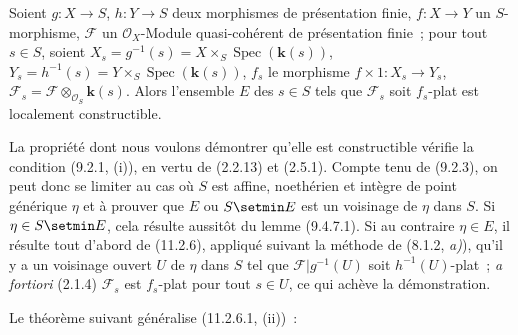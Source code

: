 \begin{proposition}[11.2.8]
\label{IV.11.2.8-fr}
Soient $g:X\to S$, $h:Y\to S$ deux morphismes de présentation finie,
$f:X\to Y$ un $S$-morphisme, $\mathcal F$ un
$\mathcal O_X$-Module quasi-cohérent de présentation finie~; pour tout
$s\in S$, soient $X_s=g^{-1}(s)=X\times_S\operatorname{Spec}(\boldsymbol{k}(s))$,
$Y_s=h^{-1}(s)=Y\times_S\operatorname{Spec}(\boldsymbol{k}(s))$, $f_s$ le morphisme
$f\times1:X_s\to Y_s$, $\mathcal F_s=\mathcal F\otimes_{\mathcal O_S}\boldsymbol{k}(s)$.
Alors l'ensemble $E$ des $s\in S$ tels que $\mathcal F_s$ soit $f_s$-plat
est localement constructible.
\end{proposition}

La propriété dont nous voulons démontrer qu'elle est constructible vérifie la
condition (9.2.1, (i)), en vertu de (2.2.13) et (2.5.1). Compte tenu de
(9.2.3), on peut donc se limiter au cas où $S$ est affine, noethérien et
intègre de point générique $\eta$ et à prouver que $E$ ou $S\setmin E$ est un
voisinage de $\eta$ dans $S$. Si $\eta\in S\setmin E$, cela résulte aussitôt du
lemme (9.4.7.1). Si au contraire $\eta\in E$, il résulte tout d'abord de
(11.2.6), appliqué suivant la méthode de (8.1.2, \emph{a)}), qu'il y a un voisinage
ouvert $U$ de $\eta$ dans $S$ tel que
$\mathcal F|g^{-1}(U)$ soit $h^{-1}(U)$-plat~; \emph{a fortiori} (2.1.4)
$\mathcal F_s$ est $f_s$-plat pour tout $s\in U$, ce qui achève la
démonstration.

Le théorème suivant généralise (11.2.6.1, (ii))~:

